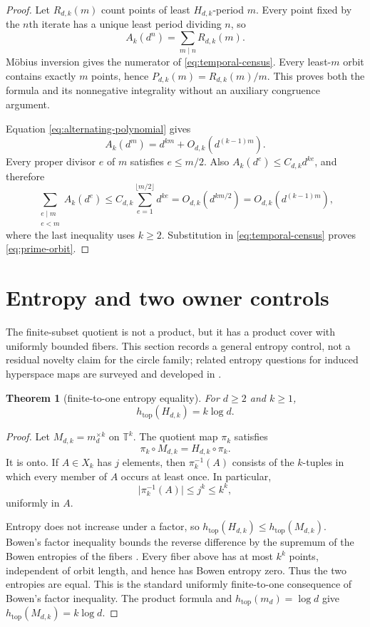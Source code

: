 \documentclass[11pt,a4paper]{amsart}
\newtheorem{theorem}{Theorem}[section]
\theoremstyle{definition}
\theoremstyle{remark}
\newcommand{\T}{\mathbb T}
\newcommand{\card}[1]{\lvert #1\rvert}
\begin{document}
\begin{proof}
Let $R_{d,k}(m)$ count points of least $H_{d,k}$-period $m$.  Every point
fixed by the $n$th iterate has a unique least period dividing $n$, so
\[
 A_k(d^n)=\sum_{m\mid n}R_{d,k}(m).
\]
M\"obius inversion gives the numerator of \eqref{eq:temporal-census}.
Every least-$m$ orbit contains exactly $m$ points, hence
$P_{d,k}(m)=R_{d,k}(m)/m$.  This proves both the formula and its
nonnegative integrality without an auxiliary congruence argument.

Equation \eqref{eq:alternating-polynomial} gives
\[
 A_k(d^m)=d^{km}+O_{d,k}(d^{(k-1)m}).
\]
Every proper divisor $e$ of $m$ satisfies $e\leq m/2$.  Also
$A_k(d^e)\leq C_{d,k}d^{ke}$, and therefore
\[
 \sum_{\substack{e\mid m\\e<m}}A_k(d^e)
 \leq C_{d,k}\sum_{e=1}^{\lfloor m/2\rfloor}d^{ke}
 =O_{d,k}(d^{km/2})
 =O_{d,k}(d^{(k-1)m}),
\]
where the last inequality uses $k\geq2$.  Substitution in
\eqref{eq:temporal-census} proves \eqref{eq:prime-orbit}.
\end{proof}

\section{Entropy and two owner controls}\label{sec:entropy-control}

The finite-subset quotient is not a product, but it has a product cover with
uniformly bounded fibers.  This section records a general entropy control,
not a residual novelty claim for the circle family; related entropy questions
for induced hyperspace maps are surveyed and developed in
\cite{KwietniakOprocha2007}.

\begin{theorem}[finite-to-one entropy equality]\label{thm:entropy}
For $d\geq2$ and $k\geq1$,
\begin{equation}\label{eq:entropy}
 h_{\mathrm{top}}(H_{d,k})=k\log d.
\end{equation}
\end{theorem}

\begin{proof}
Let $M_{d,k}=m_d^{\times k}$ on $\T^k$.  The quotient map $\pi_k$ satisfies
\[
 \pi_k\circ M_{d,k}=H_{d,k}\circ\pi_k.
\]
It is onto.  If $A\in X_k$ has $j$ elements, then $\pi_k^{-1}(A)$ consists
of the $k$-tuples in which every member of $A$ occurs at least once.  In
particular,
\[
 \card{\pi_k^{-1}(A)}\leq j^k\leq k^k,
\]
uniformly in $A$.

Entropy does not increase under a factor, so
$h_{\mathrm{top}}(H_{d,k})\leq h_{\mathrm{top}}(M_{d,k})$.  Bowen's factor
inequality bounds the reverse difference by the supremum of the Bowen
entropies of the fibers \cite{Bowen1971}.  Every fiber above has at most
$k^k$ points, independent of orbit length, and hence has Bowen entropy zero.
Thus the two entropies are equal.  This is the standard uniformly
finite-to-one consequence of Bowen's factor inequality.  The product formula and
$h_{\mathrm{top}}(m_d)=\log d$ give
$h_{\mathrm{top}}(M_{d,k})=k\log d$.
\end{proof}
\end{document}
